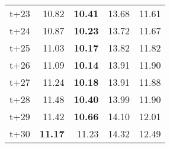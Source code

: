 \begin{table}[H]
\begin{tabular}{lrrrr}
t+23  & 10.82  & \textbf{10.41}  & 13.68  & 11.61  \\
t+24  & 10.87  & \textbf{10.23}  & 13.72  & 11.67  \\
t+25  & 11.03  & \textbf{10.17}  & 13.82  & 11.82  \\
t+26  & 11.09  & \textbf{10.14}  & 13.91  & 11.90  \\
t+27  & 11.24  & \textbf{10.18}  & 13.91  & 11.88  \\
t+28  & 11.48  & \textbf{10.40}  & 13.99  & 11.90  \\
t+29  & 11.42  & \textbf{10.66}  & 14.10  & 12.01  \\
t+30  & \textbf{11.17}  & 11.23  & 14.32  & 12.49  \\

\bottomrule
\end{tabular}
\end{table}
